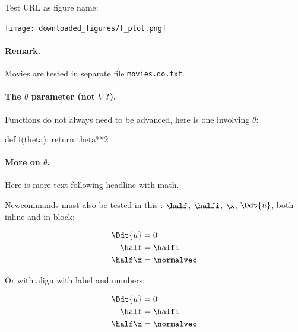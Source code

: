 \documentclass[%
oneside,                 %
final,                   %
10pt]{article}
\theoremstyle{definition}
\begin{document}
\begin{enumerate}

Test URL as figure name:

\vspace{6mm}

\centerline{\texttt{[image: downloaded\_figures/f\_plot.png]}}

\vspace{6mm}


\paragraph{Remark.}
Movies are tested in separate file \texttt{movies.do.txt}.


\paragraph{The $\theta$ parameter (not $\nabla$?).}
\label{decay:sec:theta}

Functions do not always need to be advanced, here is one
involving $\theta$:



\bdat
def f(theta):
    return theta**2

\edat


\paragraph{More on $\theta$.}
Here is more text following headline with math.

Newcommands must also be tested in this \report:
$\half$, $\halfi$, $\x$, $\Ddt{u}$,
both inline and in block:

\begin{align}
\Ddt{u} &= 0\nonumber
\\ 
\half &= \halfi\\ 
\half\x &= \normalvec
\end{align}

Or with align with label and numbers:

\begin{align}
\Ddt{u} &= 0
\label{aligneq1}
\\ 
\half &= \halfi\\ 
\half\x &= \normalvec
\label{aligneq2}
\end{align}


\end{enumerate}
\end{document}
